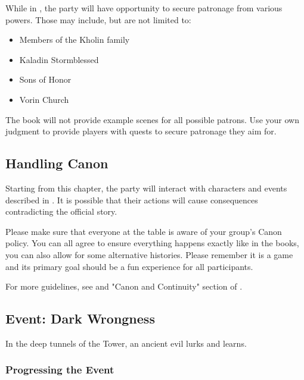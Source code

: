 While in \locationUrithiru{}, the party will have opportunity to secure patronage from various powers. Those may include, but are not limited to:

\begin{itemize}
	\item Members of the Kholin family
	\item Kaladin Stormblessed
	\item Sons of Honor
	\item Vorin Church
\end{itemize}

The book will not provide example scenes for all possible patrons. Use your own judgment to provide players with quests to secure patronage they aim for.


\subsection{Handling Canon}

Starting from this chapter, the party will interact with characters and events described in \bookSA{}. It is possible that their actions will cause consequences contradicting the official story.

Please make sure that everyone at the table is aware of your group's Canon policy. You can all agree to ensure everything happens exactly like in the books, you can also allow for some alternative histories. Please remember it is a game and its primary goal should be a fun experience for all participants.

For more guidelines, see  and "Canon and Continuity" section of \handbook{}.


\subsection{Event: Dark Wrongness}
\label{ssec:chapter8runningEvent}

In the deep tunnels of the Tower, an ancient evil lurks and learns.\\



\subsubsection{Progressing the Event}

